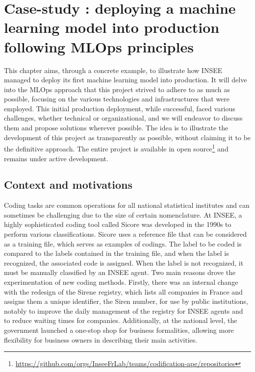 \section{Case-study : deploying a machine learning model into production following MLOps principles}
\label{sec:mlops}

This chapter aims, through a concrete example, to illustrate how INSEE managed to deploy its first machine learning model into production. It will delve into the MLOps approach that this project strived to adhere to as much as possible, focusing on the various technologies and infrastructures that were employed. This initial production deployment, while successful, faced various challenges, whether technical or organizational, and we will endeavor to discuss them and propose solutions wherever possible. The idea is to illustrate the development of this project as transparently as possible, without claiming it to be the definitive approach. The entire project is available in open source\footnote{\url{https://github.com/orgs/InseeFrLab/teams/codification-ape/repositories}} and remains under active development.

\subsection{Context and motivations}

Coding tasks are common operations for all national statistical institutes and can sometimes be challenging due to the size of certain nomenclature. At INSEE, a highly sophisticated coding tool called Sicore was developed in the 1990s to perform various classifications. Sicore uses a reference file that can be considered as a training file, which serves as examples of codings. The label to be coded is compared to the labels contained in the training file, and when the label is recognized, the associated code is assigned. When the label is not recognized, it must be manually classified by an INSEE agent. Two main reasons drove the experimentation of new coding methods. Firstly, there was an internal change with the redesign of the Sirene registry, which lists all companies in France and assigns them a unique identifier, the Siren number, for use by public institutions, notably to improve the daily management of the registry for INSEE agents and to reduce waiting times for companies. Additionally, at the national level, the government launched a one-stop shop for business formalities, allowing more flexibility for business owners in describing their main activities.

